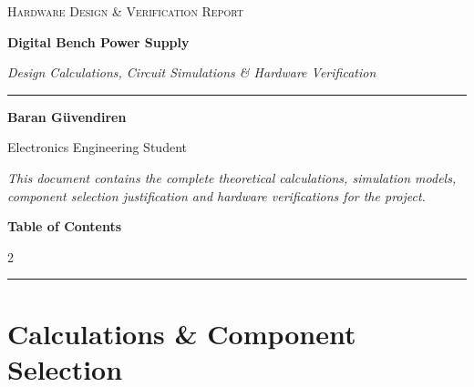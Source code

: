 \documentclass[11pt, a4paper]{article}
\begin{document}
\begin{titlepage}
    \centering
    \vspace*{1.5cm}
    {\scshape\Large Hardware Design \& Verification Report \par}
    \vspace{2.5cm}
    
    {\huge\bfseries Digital Bench Power Supply \par}
    \vspace{0.4cm}
    
    {\Large\itshape Design Calculations, Circuit Simulations \& Hardware Verification \par}
    \rule{\textwidth}{1.2pt}
    
    \vspace{2.5cm}
    
    {\large\bfseries Baran Güvendiren \par}
    \vspace{0.2cm}
    {\small Electronics Engineering Student \par}

    \vfill
    \begin{minipage}{0.85\textwidth}
        \centering
        \small\itshape
        This document contains the complete theoretical calculations, simulation models, component selection justification and hardware verifications for the project.
    \end{minipage}
\end{titlepage}
\clearpage

\hypersetup{linkcolor=blue, linktoc=page}

{\centering\Large\bfseries\sffamily Table of Contents \par}
\vspace{0.25cm}

\begin{multicols}{2}
  \setcounter{tocdepth}{2}
  \tableofcontents
  \thispagestyle{fancy}
\end{multicols}
\rule{\textwidth}{0.4pt}

\hypersetup{linkcolor=black}
\clearpage

\section{Calculations \& Component Selection}
\end{document}
